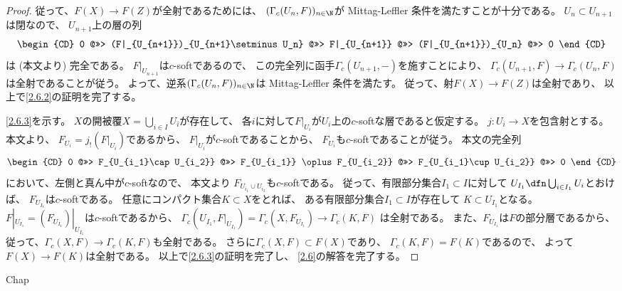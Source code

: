\documentclass[uplatex,dvipdfmx]{jsarticle}
\begin{document}
\begin{proof}
  従って、\(F(X)\to F(Z)\)が全射であるためには、
  \((\Gamma_c(U_n,F))_{n\in \N}\)が Mittag-Leffler 条件を満たすことが十分である。
  \(U_n\subset U_{n+1}\)は閉なので、
  \(U_{n+1}\)上の層の列
  \[
  \begin{CD}
    0 @>>> (F|_{U_{n+1}})_{U_{n+1}\setminus U_n}
    @>>> F|_{U_{n+1}} @>>> (F|_{U_{n+1}})_{U_n} @>>> 0
  \end{CD}
  \]
  は (本文\cite[Proposition 2.6.6 (v)]{kashiwara2002sheaves}より) 完全である。
  \(F|_{U_{n+1}}\)は\(c\)-softであるので、
  この完全列に函手\(\Gamma_c(U_{n+1},-)\)を施すことにより、
  \(\Gamma_c(U_{n+1},F)\to \Gamma_c(U_n,F)\)は全射であることが従う。
  よって、逆系\((\Gamma_c(U_n,F))_{n\in \N}\)は Mittag-Leffler 条件を満たす。
  従って、射\(F(X)\to F(Z)\)は全射であり、
  以上で\ref{2.6.2}の証明を完了する。

  \ref{2.6.3}を示す。
  \(X\)の開被覆\(X = \bigcup_{i\in I}U_i\)が存在して、
  各\(i\)に対して\(F|_{U_i}\)が\(U_i\)上の\(c\)-softな層であると仮定する。
  \(j:U_i\to X\)を包含射とする。
  本文\cite[Proposition 2.5.4 (ii)]{kashiwara2002sheaves}より、
  \(F_{U_i} = j_!(F|_{U_i})\)であるから、
  \(F|_{U_i}\)が\(c\)-softであることから、
  \(F_{U_i}\)も\(c\)-softであることが従う。
  本文\cite[Proposition 2.3.6 (vii)]{kashiwara2002sheaves}の完全列
  \[
  \begin{CD}
    0 @>>> F_{U_{i_1}\cap U_{i_2}} @>>> F_{U_{i_1}} \oplus F_{U_{i_2}}
    @>>> F_{U_{i_1}\cup U_{i_2}} @>>> 0
  \end{CD}
  \]
  において、左側と真ん中が\(c\)-softなので、
  本文\cite[Corollary 2.5.9]{kashiwara2002sheaves}より
  \(F_{U_{i_1}\cup U_{i_2}}\)も\(c\)-softである。
  従って、有限部分集合\(I_1\subset I\)に対して
  \(U_{I_1} \dfn \bigcup_{i\in I_1} U_i\)とおけば、
  \(F_{U_{I_1}}\)は\(c\)-softである。
  任意にコンパクト集合\(K\subset X\)をとれば、
  ある有限部分集合\(I_1\subset I\)が存在して
  \(K\subset U_{I_1}\)となる。
  \(F|_{U_{I_1}} = (F_{U_{I_1}})|_{U_{I_1}}\)は\(c\)-softであるから、
  \(\Gamma_c(U_{I_1},F|_{U_{I_1}}) = \Gamma_c(X,F_{U_{I_1}}) \to \Gamma_c(K,F)\)
  は全射である。
  また、\(F_{U_{I_1}}\)は\(F\)の部分層であるから、
  従って、\(\Gamma_c(X,F) \to \Gamma_c(K,F)\)も全射である。
  さらに\(\Gamma_c(X,F) \subset F(X)\)であり、
  \(\Gamma_c(K,F) = F(K)\)であるので、
  よって\(F(X) \to F(K)\)は全射である。
  以上で\ref{2.6.3}の証明を完了し、
  \autoref{2.6}の解答を完了する。
\end{proof}



\ifcsname Chap\endcsname\else
\printbibliography
\end{document}
